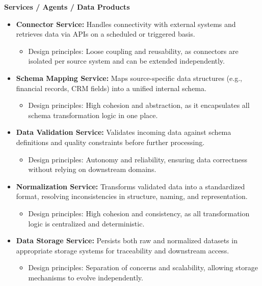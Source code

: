 \documentclass[
  letterpaper,
  DIV=11,
  numbers=noendperiod]{scrartcl}
\providecommand{\tightlist}{%
  \setlength{\itemsep}{0pt}\setlength{\parskip}{0pt}}\usepackage{longtable,booktabs,array}
\begin{document}
\textbf{Services / Agents / Data Products}

\begin{itemize}
\item
  \textbf{Connector Service:} Handles connectivity with external systems
  and retrieves data via APIs on a scheduled or triggered basis.

  \begin{itemize}
  \tightlist
  \item
    Design principles: Loose coupling and reusability, as connectors are
    isolated per source system and can be extended independently.
  \end{itemize}
\item
  \textbf{Schema Mapping Service:} Maps source-specific data structures
  (e.g., financial records, CRM fields) into a unified internal schema.

  \begin{itemize}
  \tightlist
  \item
    Design principles: High cohesion and abstraction, as it encapsulates
    all schema transformation logic in one place.
  \end{itemize}
\item
  \textbf{Data Validation Service:} Validates incoming data against
  schema definitions and quality constraints before further processing.

  \begin{itemize}
  \tightlist
  \item
    Design principles: Autonomy and reliability, ensuring data
    correctness without relying on downstream domains.
  \end{itemize}
\item
  \textbf{Normalization Service:} Transforms validated data into a
  standardized format, resolving inconsistencies in structure, naming,
  and representation.

  \begin{itemize}
  \tightlist
  \item
    Design principles: High cohesion and consistency, as all
    transformation logic is centralized and deterministic.
  \end{itemize}
\item
  \textbf{Data Storage Service:} Persists both raw and normalized
  datasets in appropriate storage systems for traceability and
  downstream access.

  \begin{itemize}
  \tightlist
  \item
    Design principles: Separation of concerns and scalability, allowing
    storage mechanisms to evolve independently.
  \end{itemize}
\end{itemize}
\end{document}
